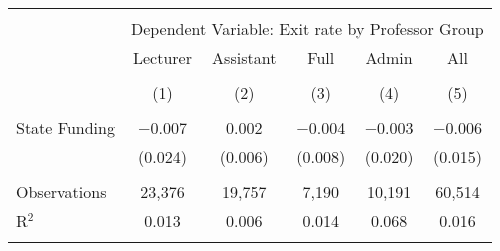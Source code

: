 
\begin{tabular}{@{\extracolsep{5pt}}lccccc} 
\\[-1.8ex]\hline 
\hline \\[-1.8ex] 
 & \multicolumn{5}{c}{Dependent Variable: Exit rate by Professor Group} \\ 
\cline{2-6} 
 & Lecturer & Assistant & Full & Admin & All \\ 
\\[-1.8ex] & (1) & (2) & (3) & (4) & (5)\\ 
\hline \\[-1.8ex] 
 State Funding & $-$0.007 & 0.002 & $-$0.004 & $-$0.003 & $-$0.006 \\ 
  & (0.024) & (0.006) & (0.008) & (0.020) & (0.015) \\ 
 \hline \\[-1.8ex] 
Observations & 23,376 & 19,757 & 7,190 & 10,191 & 60,514 \\ 
R$^{2}$ & 0.013 & 0.006 & 0.014 & 0.068 & 0.016 \\ 
\hline 
\hline \\[-1.8ex] 
\end{tabular} 
